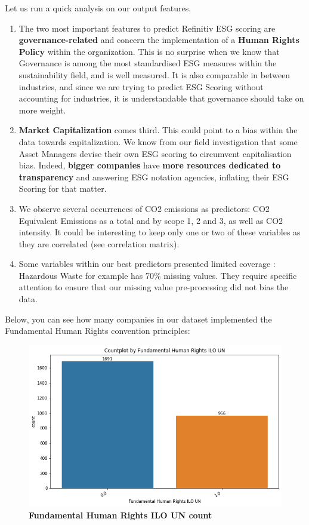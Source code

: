 \documentclass[12pt]{report}
\begin{document}
Let us run a quick analysis on our output features. 
\begin{enumerate}
\setlength\itemsep{0em}
    \item The two most important features to predict Refinitiv ESG scoring are \textbf{governance-related} and concern the implementation of a \textbf{Human Rights Policy} within the organization. This is no surprise when we know that Governance is among the most standardised ESG measures within the sustainability field, and is well measured. It is also comparable in between industries, and since we are trying to predict ESG Scoring without accounting for industries, it is understandable that governance should take on more weight. 
    \item \textbf{Market Capitalization} comes third. This could point to a bias within the data towards capitalization. We know from our field investigation that some Asset Managers devise their own ESG scoring to circumvent capitalisation bias. Indeed, \textbf{bigger companies} have \textbf{more resources dedicated to transparency} and answering ESG notation agencies, inflating their ESG Scoring for that matter.
    \item We observe several occurrences of CO2 emissions as predictors: CO2 Equivalent Emissions as a total and by scope 1, 2 and 3, as well as CO2 intensity. It could be interesting to keep only one or two of these variables as they are correlated (see correlation matrix). 
    \item Some variables within our best predictors presented limited coverage : Hazardous Waste for example has 70\% missing values. They require specific attention to ensure that our missing value pre-processing did not bias the data. 
\end{enumerate}

Below, you can see how many companies in our dataset implemented the Fundamental Human Rights convention principles:

\begin{figure}[h!]
\centering
\includegraphics[scale=0.5]{human_rights.png}
\caption{\textbf{Fundamental Human Rights ILO UN count}}
\label{fig:human_rights}
\end{figure}
\end{document}
